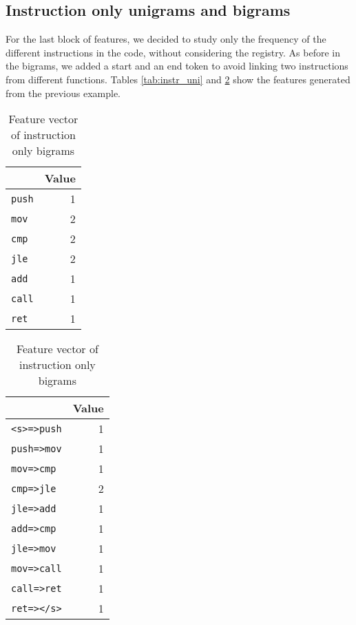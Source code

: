 \subsection{Instruction only unigrams and bigrams}
For the last block of features, we decided to study only the frequency of the different instructions in the code, without considering the registry. As before in the bigrams, we added a start and an end token to avoid linking two instructions from different functions. Tables \ref{tab:instr_uni} and \ref{tab:instr_big} show the features generated from the previous example.

\begin{table}[!htb]
	\begin{minipage}{.5\linewidth}
		\centering
		
		\caption{Feature vector of instruction only unigrams}
		\label{tab:instr_uni}
		
		\medskip
		
		\begin{tabular}{  lr } 
			\toprule
			\makecell{ Feature }  &  Value \\   
			
			\midrule 
			\texttt{push} & 1	\\
			\texttt{mov} & 2\\
			\texttt{cmp} & 2\\
			\texttt{jle} & 2\\
			\texttt{add} & 1\\
			\texttt{call} & 1\\
			\texttt{ret} & 1\\
			\bottomrule
		\end{tabular}
	\end{minipage}\hfill
	\begin{minipage}{.5\linewidth}
		\centering
		
		\caption{Feature vector of instruction only bigrams}
		\label{tab:instr_big}
		
		\medskip
		
		\begin{tabular}{  lr } 
			\toprule
			\makecell{ Feature }  &  Value \\   
			
			\midrule 
			\texttt{<s>=>push} & 1	\\
			\texttt{push=>mov} & 1\\
			\texttt{mov=>cmp} & 1\\
			\texttt{cmp=>jle} & 2\\
			\texttt{jle=>add} & 1\\
			\texttt{add=>cmp} & 1\\
			\texttt{jle=>mov} & 1\\
			\texttt{mov=>call} & 1\\
			\texttt{call=>ret} & 1\\
			\texttt{ret=></s>} & 1\\
			\bottomrule
		\end{tabular}
	\end{minipage}
\end{table}


